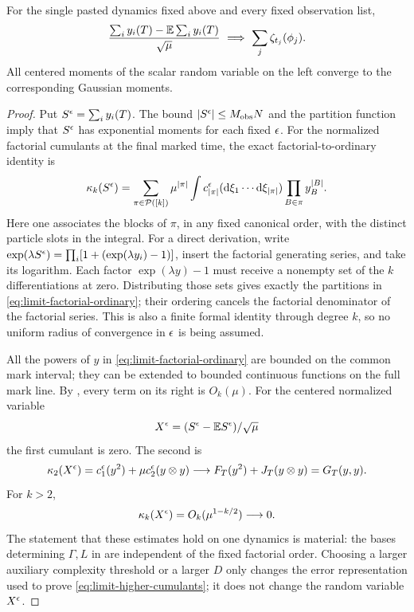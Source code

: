 \begin{proposition}
\label{prop:cumulant-clt}
For the single pasted dynamics fixed above and every fixed observation
list,
\[
 \frac{\sum_i y_i(T)-\mathbb E\sum_i y_i(T)}{\sqrt\mu}
       \ \Longrightarrow\
           \sum_j\zeta_{t_j}(\phi_j).
\]
All centered moments of the scalar random variable on the left
converge to the corresponding Gaussian moments.
\end{proposition}

\begin{proof}
Put \(S^\epsilon=\sum_i y_i(T)\).  The bound
\(|S^\epsilon|\le M_{\mathrm{obs}}N\) and the partition function imply
that \(S^\epsilon\) has exponential moments for each fixed \(\epsilon\).
For the normalized factorial cumulants at the final marked time,
the exact factorial-to-ordinary identity is
\begin{equation}\label{eq:limit-factorial-ordinary}
 \kappa_k(S^\epsilon)=
   \sum_{\pi\in\mathcal P([k])}\mu^{|\pi|}
       \int c_{|\pi|}^{\epsilon}(\mathrm d\xi_1\cdots\mathrm d\xi_{|\pi|})
                     \prod_{B\in\pi} y_B^{|B|}.
\end{equation}
Here one associates the blocks of \(\pi\), in any fixed canonical
order, with the distinct particle slots in the integral.
For a direct derivation, write
\(\exp(\lambda S^\epsilon)=\prod_i[1+(\exp(\lambda y_i)-1)]\),
insert the factorial generating series, and take its logarithm.
Each factor \(\exp(\lambda y)-1\) must receive a nonempty set of the
\(k\) differentiations at zero.  Distributing those sets gives
exactly the partitions in \eqref{eq:limit-factorial-ordinary};
their ordering cancels the factorial denominator of the factorial
series.  This is also a finite formal identity through degree \(k\),
so no uniform radius of convergence in \(\epsilon\) is being assumed.

All the powers of \(y\) in \eqref{eq:limit-factorial-ordinary} are
bounded on the common mark interval; they can be extended to bounded
continuous functions on the full mark line.  By
, every term on its right is \(O_k(\mu)\).
For the centered normalized variable
\[
                     X^\epsilon=(S^\epsilon-\mathbb E S^\epsilon)/\sqrt\mu
\]
the first cumulant is zero.  The second is
\[
 \kappa_2(X^\epsilon)
       =c_1^\epsilon(y^2)+\mu c_2^\epsilon(y\otimes y)
       \longrightarrow F_T(y^2)+J_T(y\otimes y)=G_T(y,y).
\]
For \(k>2\),
\begin{equation}\label{eq:limit-higher-cumulants}
                  \kappa_k(X^\epsilon)=O_k(\mu^{1-k/2})\longrightarrow0.
\end{equation}
The statement that these estimates hold on one dynamics is material:
the bases determining \(\Gamma,L\) in
 are independent of
the fixed factorial order.  Choosing a larger auxiliary complexity
threshold or a larger \(D\) only changes the error representation
used to prove \eqref{eq:limit-higher-cumulants}; it does not change
the random variable \(X^\epsilon\).


\end{proof}
